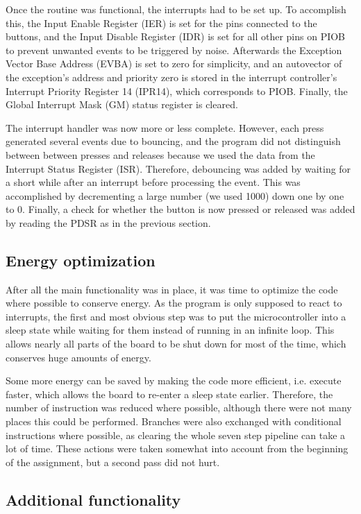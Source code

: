 Once the routine was functional, the interrupts had to be set up. To accomplish this, the Input Enable Register (IER) is set for the pins connected to the buttons, and the Input Disable Register (IDR) is set for all other pins on PIOB to prevent unwanted events to be triggered by noise. Afterwards the Exception Vector Base Address (EVBA) is set to zero for simplicity, and an autovector of the exception’s address and priority zero is stored in the interrupt controller’s Interrupt Priority Register 14 (IPR14), which corresponds to PIOB. Finally, the Global Interrupt Mask (GM) status register is cleared.

The interrupt handler was now more or less complete. However, each press generated several events due to bouncing, and the program did not distinguish between between presses and releases because we used the data from the Interrupt Status Register (ISR). Therefore, debouncing was added by waiting for a short while after an interrupt before processing the event. This was accomplished by decrementing a large number (we used 1000) down one by one to 0. Finally, a check for whether the button is now pressed or released was added by reading the PDSR as in the previous section.

\subsection{Energy optimization}

After all the main functionality was in place, it was time to optimize the code where possible to conserve energy. As the program is only supposed to react to interrupts, the first and most obvious step was to put the microcontroller into a sleep state while waiting for them instead of running in an infinite loop. This allows nearly all parts of the board to be shut down for most of the time, which conserves huge amounts of energy.

Some more energy can be saved by making the code more efficient, i.e. execute faster, which allows the board to re-enter a sleep state earlier. Therefore, the number of instruction was reduced where possible, although there were not many places this could be performed. Branches were also exchanged with conditional instructions where possible, as clearing the whole seven step pipeline can take a lot of time. These actions were taken somewhat into account from the beginning of the assignment, but a second pass did not hurt.
\subsection{Additional functionality}

